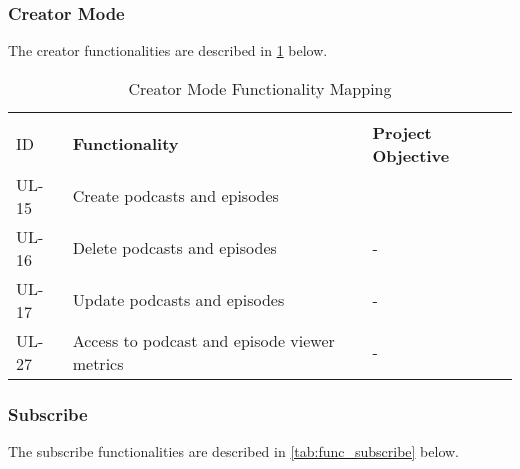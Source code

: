 \documentclass[../report.tex]{subfiles}
\begin{document}
\subsubsection{Creator Mode}

The creator functionalities are described in \cref{tab:func_creator} below.

\begin{longtable}[c]{|l|l|l|}
  \caption{Creator Mode Functionality Mapping}
  \label{tab:func_creator}\\
  \hline
  \rowcolor[HTML]{E2E2E2} 
  \textbf{\begin{tabular}[c]{@{}l@{}}Story \\ ID\end{tabular}} & \textbf{Functionality}                       & \textbf{Project Objective}                  \\ \hline
  \endfirsthead
  \endhead
  \rowcolor[HTML]{FAFAFA} 
  UL-15                                                        & Create podcasts and episodes                 & \cellcolor[HTML]{FAFAFA}                    \\
  \rowcolor[HTML]{FAFAFA} 
  UL-16                                                        & Delete podcasts and episodes                 & \multirow{-2}{*}{\cellcolor[HTML]{FAFAFA}-} \\ \hline
  \rowcolor[HTML]{FAFAFA} 
  UL-17                                                        & Update podcasts and episodes                 & -                                           \\ \hline
  \rowcolor[HTML]{E8FBFF} 
  UL-27                                                        & Access to podcast and episode viewer metrics & -                                           \\ \hline
\end{longtable}

\subsubsection{Subscribe}

The subscribe functionalities are described in \cref{tab:func_subscribe} below.
\end{document}
